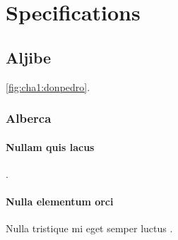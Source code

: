 % 
% 
% 



\clearpage
\cleardoublepage

\chapter{Specifications}

\section{Aljibe}

\autoref{fig:cha1:donpedro}. \lipsum[50-51]

\subsection{Alberca}

\subsubsection{Nullam quis lacus}

\lipsum[52] \cite{un-2030-agenda}

\lipsum[53-55] \cite{itu-r-reg-articles, ecss-e-st-50-05c}.

\subsubsection{Nulla elementum orci}

\lipsum[56] Nulla tristique mi eget semper luctus \cite{an1368-analog-ferrite}. \lipsum[57]


